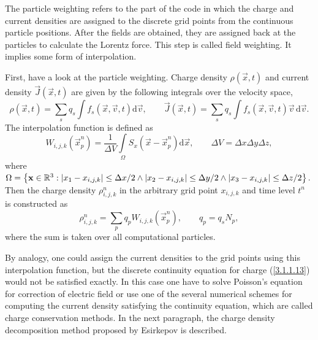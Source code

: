 The particle weighting refers to the part of the code in which the charge and current densities are assigned to the discrete grid points from the continuous particle positions. After the fields are obtained, they are assigned back at the particles to calculate the Lorentz force. This step is called field weighting. It implies some form of interpolation.

First, have a look at the particle weighting. Charge density $ \rho\left(\vec{x}, t \right) $ and current density $ \vec{J}\left(\vec{x}, t \right) $ are given by the following integrals over the velocity space,
\begin{equation}
\label{3.1.2.1}
\rho\left(\vec{x}, t \right) = \sum_s q_s \int f_s \left(\vec{x}, \vec{v}, t \right) \mathrm{d} \vec{v}, \qquad \vec{J}\left(\vec{x}, t \right) = \sum_s q_s \int f_s \left(\vec{x}, \vec{v}, t \right) \vec{v} \, \mathrm{d} \vec{v}.
\end{equation}
The interpolation function is defined as
\begin{equation}
\label{3.1.2.2}
W_{i, j, k}\left(\vec{x}_{p}^{n}\right) =  \frac{1}{\Delta V}\int\limits_{\Omega} S_{x}\left(\vec{x} - \vec{x}_{p}^{n} \right) \mathrm{d} \vec{x}, \qquad \Delta V = \Delta x \Delta y \Delta z,
\end{equation}
where $ \Omega = \left\lbrace \mathbf{x} \in \mathbb{R}^{3} : \lvert x_{1} - x_{i, j, k}\rvert \leq \Delta x/2 \wedge \lvert x_{2} - x_{i, j, k}\rvert \leq \Delta y/2 \wedge \lvert x_{3} - x_{i, j, k}\rvert \leq \Delta z/2 \right\rbrace $. Then the charge density $ \rho_{i, j, k}^{n} $ in the arbitrary grid point $ x_{i, j, k} $ and time level $ t^{n} $ is constructed as
\begin{equation}
\label{3.1.2.3}
\rho_{i, j, k}^{n} = \sum_{p} q_{p} W_{i, j, k}\left(\vec{x}_{p}^{n}\right), \qquad q_{p} = q_{s} N_{p},
\end{equation}
where the sum is taken over all computational particles.

By analogy, one could assign the current densities to the grid points using this interpolation function, but the discrete continuity equation for charge (\ref{3.1.1.13}) would not be satisfied exactly. In this case one have to solve Poisson's equation for correction of electric field or use one of the several numerical schemes for computing the current density satisfying the continuity equation, which are called charge conservation methods. In the next paragraph, the charge density decomposition method proposed by Esirkepov \cite{esirkepov} is described.

